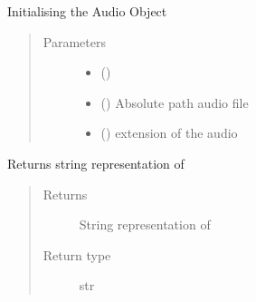 \documentclass[letterpaper,10pt,english]{sphinxmanual}
\begin{document}
\begin{fulllineitems}
\begin{quote}
\begin{description}
\end{description}\end{quote}

\begin{fulllineitems}
\label{\detokenize{docs/source/preprocess:preprocess.track_classes.Audio.__init__}}
Initialising the Audio Object
\begin{quote}\begin{description}
\item[{Parameters}] \leavevmode\begin{itemize}
\item {} 
 () \textendash{} 

\item {} 
 () \textendash{} Absolute path audio file

\item {} 
 () \textendash{} extension of the audio

\end{itemize}

\end{description}\end{quote}

\end{fulllineitems}


\begin{fulllineitems}
\label{\detokenize{docs/source/preprocess:preprocess.track_classes.Audio.__repr__}}
Returns string representation of 
\begin{quote}\begin{description}
\item[{Returns}] \leavevmode
String representation of 

\item[{Return type}] \leavevmode
str


\end{description}
\end{quote}
\end{fulllineitems}
\end{fulllineitems}
\end{document}
